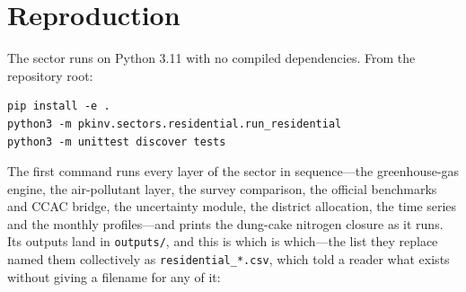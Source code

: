 \section{Reproduction}
\label{app:repro}

The sector runs on Python 3.11 with no compiled dependencies. From the repository
root:

{\footnotesize
\begin{verbatim}
pip install -e .
python3 -m pkinv.sectors.residential.run_residential
python3 -m unittest discover tests
\end{verbatim}
}

The first command runs every layer of the sector in sequence---the greenhouse-gas
engine, the air-pollutant layer, the survey comparison, the official benchmarks and
CCAC bridge, the uncertainty module, the district allocation, the time series and
the monthly profiles---and prints the dung-cake nitrogen closure as it runs. Its outputs land
in \texttt{outputs/}, and this is which is which---the list they replace named them
collectively as \texttt{residential\_*.csv}, which told a reader what exists without giving a
filename for any of it:

